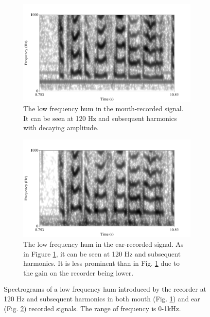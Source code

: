 \begin{figure}[h]
\centering
\begin{subfigure}{0.475\textwidth}
  \centering
  \includegraphics[width=1\linewidth]{figure/low_frequency_hum.png}
  \caption{The low frequency hum in the mouth-recorded signal.  It can be seen at 120 Hz and subsequent harmonics with decaying amplitude.}
  \label{fig:low_freq_hum-mouth}
\end{subfigure}%
\hfill
\begin{subfigure}{0.475\textwidth}
  \centering
  \includegraphics[width=1\linewidth]{figure/low_frequency_hum-ear.png}
  \caption{The low frequency hum in the ear-recorded signal. As in Figure \ref{fig:low_freq_hum-mouth}, it can be seen at 120 Hz and subsequent harmonics.  It is less prominent than in Fig. \ref{fig:low_freq_hum-mouth} due to the gain on the recorder being lower.}
  \label{fig:low_freq_hum-ear}
\end{subfigure}
\caption{Spectrograms of a low frequency hum introduced by the recorder at 120 Hz and subsequent harmonics in both mouth (Fig. \ref{fig:low_freq_hum-mouth}) and ear (Fig. \ref{fig:low_freq_hum-ear}) recorded signals. The range of frequency is 0-1kHz.}
\label{fig:low_freq_hum}
\end{figure}

